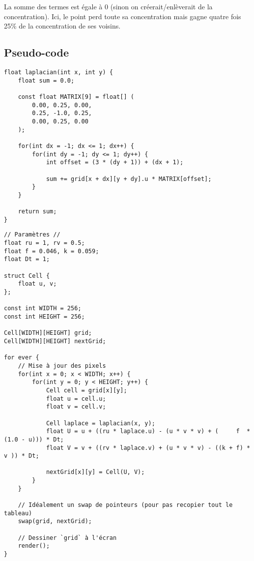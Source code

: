 \documentclass[11pt]{scrartcl}
\begin{document}
            La somme des termes est égale à $0$ (sinon on créerait/enlèverait de la concentration).
            Ici, le point perd toute sa concentration mais gagne quatre fois 25\% de la concentration de ses voisins.

        \subsection{Pseudo-code}\label{subsec:pseudo-code}

            \begin{verbatim}
float laplacian(int x, int y) {
    float sum = 0.0;

    const float MATRIX[9] = float[] (
        0.00, 0.25, 0.00,
        0.25, -1.0, 0.25,
        0.00, 0.25, 0.00
    );

    for(int dx = -1; dx <= 1; dx++) {
        for(int dy = -1; dy <= 1; dy++) {
            int offset = (3 * (dy + 1)) + (dx + 1);

            sum += grid[x + dx][y + dy].u * MATRIX[offset];
        }
    }

    return sum;
}
            \end{verbatim}

            \begin{verbatim}
// Paramètres //
float ru = 1, rv = 0.5;
float f = 0.046, k = 0.059;
float Dt = 1;

struct Cell {
    float u, v;
};

const int WIDTH = 256;
const int HEIGHT = 256;

Cell[WIDTH][HEIGHT] grid;
Cell[WIDTH][HEIGHT] nextGrid;

for ever {
    // Mise à jour des pixels
    for(int x = 0; x < WIDTH; x++) {
        for(int y = 0; y < HEIGHT; y++) {
            Cell cell = grid[x][y];
            float u = cell.u;
            float v = cell.v;

            Cell laplace = laplacian(x, y);
            float U = u + ((ru * laplace.u) - (u * v * v) + (     f  * (1.0 - u))) * Dt;
            float V = v + ((rv * laplace.v) + (u * v * v) - ((k + f) *        v )) * Dt;

            nextGrid[x][y] = Cell(U, V);
        }
    }

    // Idéalement un swap de pointeurs (pour pas recopier tout le tableau)
    swap(grid, nextGrid);

    // Dessiner `grid` à l'écran
    render();
}
            \end{verbatim}
\end{document}
